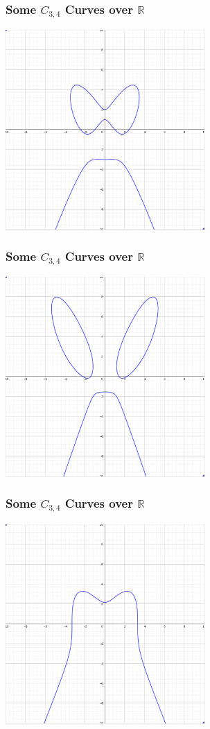 \documentclass{beamer}
\newcommand{\bb}[1]{\mathbb{#1}}
\begin{document}

\begin{frame}
\frametitle{Some $C_{3,4}$ Curves over $\bb R$}
  \begin{center} \includegraphics[height=7.6cm]{curve1.png} \end{center}
\end{frame}
\begin{frame}
\frametitle{Some $C_{3,4}$ Curves over $\bb R$}
  \begin{center} \includegraphics[height=7.6cm]{curve2.png} \end{center}
\end{frame}
\begin{frame}
\frametitle{Some $C_{3,4}$ Curves over $\bb R$}
  \begin{center} \includegraphics[height=7.6cm]{curve3.png} \end{center}
\end{frame}
\end{document}
